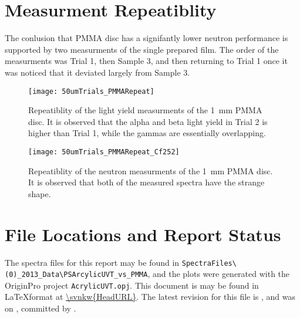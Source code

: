 \documentclass[draftcls,onecolumn]{IEEEtran}
\begin{document}
\section{Measurment Repeatiblity}
The conlusion that PMMA disc has a signifantly lower neutron performance is supported by two measurments of the single prepared film.
The order of the measurments was Trial 1, then Sample 3, and then returning to Trial 1 once it was noticed that it deviated largely from Sample 3.
\begin{figure}
  \centering
  \texttt{[image: 50umTrials\_PMMARepeat]}
  \caption[PMMA Light Yield Repeatiblity]{Repeatiblity of the light yield measurments of the \SI{1}{\mm} PMMA disc. It is observed that the alpha and beta light yield in Trial 2 is higher than Trial 1, while the gammas are essentially overlapping.}
  \label{fig:MeasRepeatLY}
\end{figure}
\begin{figure}
  \centering
  \texttt{[image: 50umTrials\_PMMARepeat\_Cf252]}
  \caption[PMMA Neutron Repeatiblity]{Repeatiblity of the neutron measurments of the \SI{1}{\mm} PMMA disc. It is observed that both of the measured spectra have the strange shape.}
  \label{fig:MeasRepeatNeutron}
\end{figure}

\section{File Locations and Report Status}
The spectra files for this report may be found in \texttt{SpectraFiles\textbackslash(0)\_2013\_Data\textbackslash PSArcylicUVT\_vs\_PMMA}, and the plots were generated with the OriginPro project \texttt{AcrylicUVT.opj}.
This document is may be found in \LaTeX format at \url{\svnkw{HeadURL}}.  
The latest revision for this file is \svnrev, and was on \svndate, committed by \svnauthor.
\end{document}
